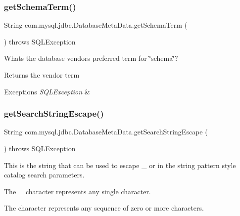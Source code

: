 \subsubsection{\texorpdfstring{get\+Schema\+Term()}{getSchemaTerm()}}
{\footnotesize\ttfamily String com.\+mysql.\+jdbc.\+Database\+Meta\+Data.\+get\+Schema\+Term (\begin{DoxyParamCaption}{ }\end{DoxyParamCaption}) throws S\+Q\+L\+Exception}

What\textquotesingle{}s the database vendor\textquotesingle{}s preferred term for \char`\"{}schema\char`\"{}?

\begin{DoxyReturn}{Returns}
the vendor term 
\end{DoxyReturn}

\begin{DoxyExceptions}{Exceptions}
{\em S\+Q\+L\+Exception} & \\
\hline
\end{DoxyExceptions}
\mbox{\label{classcom_1_1mysql_1_1jdbc_1_1_database_meta_data_a210b7942557a965c3af550074bb6fe9d}} 
\subsubsection{\texorpdfstring{get\+Search\+String\+Escape()}{getSearchStringEscape()}}
{\footnotesize\ttfamily String com.\+mysql.\+jdbc.\+Database\+Meta\+Data.\+get\+Search\+String\+Escape (\begin{DoxyParamCaption}{ }\end{DoxyParamCaption}) throws S\+Q\+L\+Exception}

This is the string that can be used to escape \textquotesingle{}\+\_\+\textquotesingle{} or \textquotesingle{}\textquotesingle{} in the string pattern style catalog search parameters. 

The \textquotesingle{}\+\_\+\textquotesingle{} character represents any single character. 

The \textquotesingle{}\textquotesingle{} character represents any sequence of zero or more characters. 

